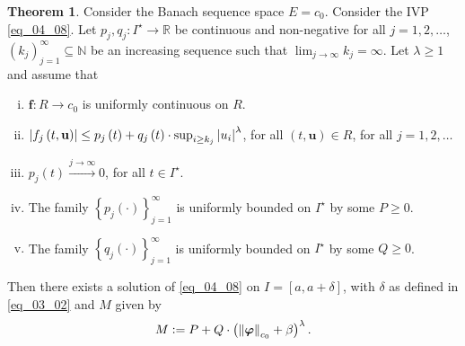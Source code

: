 \documentclass[reqno]{amsart}
\numberwithin{equation}{section}
\theoremstyle{definition}
\newtheorem{theorem}{Theorem}
\theoremstyle{remark}
\newcommand{\br}[1]{\left(#1\right)}
\newcommand{\bu}{\mathbf{u}}
\newcommand{\bvarphi}{\boldsymbol{\varphi}}
\newcommand{\cbr}[1]{\left\{#1\right\}}
\newcommand{\defeq}{\vcentcolon=}
\newcommand{\N}{\mathbb{N}}
\newcommand{\R}{\mathbb{R}}
\newcommand{\sbr}[1]{\left[#1\right]}
\newcommand{\sI}{I^{\star}}
\newcommand{\st}{\!:}
\begin{document}
	\begin{theorem}\label{thm_17}
		Consider the Banach sequence space $E=c_0$. Consider the IVP \eqref{eq_04_08}. Let  $p_j,q_j\st\sI\rightarrow\R$ be continuous and non-negative for all $j=1,2,\dots$, $\br{k_j}_{j=1}^{\infty}\subseteq\N$ be an increasing sequence such that $\lim_{j\rightarrow\infty}k_j=\infty$. Let $\lambda\geq1$ and assume that
		\begin{enumerate}[(i)]
			\item $\mathbf{f}\st{R}\rightarrow{c}_0$ is uniformly continuous on $R$.\label{th_04_02_ass_01}
			\item $\abs{f_j\br{t,\bu}}\leq{p}_j\br{t}+q_j\br{t}\cdot\sup_{i\geq{k}_j}\abs{u_i}^{\lambda}$, for all $\br{t,\bu}\in{R}$, for all $j=1,2,\dots$\label{th_04_02_ass_02}
			\item $p_j\br{t}\xrightarrow{j\rightarrow\infty}0$, for all $t\in\sI$.\label{th_04_02_ass_03}
			\item The family $\cbr{p_j\br{\cdot}}_{j=1}^{\infty}$ is uniformly bounded on $\sI$ by some $P\geq0$.
			\item The family $\cbr{q_j\br{\cdot}}_{j=1}^{\infty}$ is uniformly bounded on $\sI$ by some $Q\geq0$.\label{th_04_02_ass_05}
		\end{enumerate}
		Then there exists a solution of \eqref{eq_04_08} on $I=\sbr{a,a+\delta}$, with $\delta$ as defined in \eqref{eq_03_02} and $M$ given by
		\begin{equation}\label{eq_04_09}
			M\defeq{P}+Q\cdot\br{\norm{\bvarphi}_{c_0}+\beta}^{\lambda}.
		\end{equation}
	\end{theorem}
\end{document}
